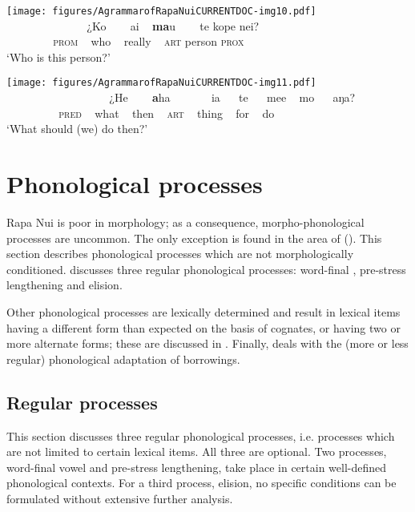  
\ea\label{ex:2.12}
\texttt{[image: figures/AgrammarofRapaNuiCURRENTDOC-img10.pdf]}\\
\gll ~ ~ ~ ~ ~~~~~~~ ¿Ko ~~~ ai ~ \textbf{ma}u ~~~ te kope nei? \\
 ~ ~ ~ ~ ~ \textsc{prom} ~ who ~ really ~ \textsc{art} person \textsc{prox} \\

\glt 
‘Who is this person?’ \textstyleExampleref{[R630-05.063]}
\z

\ea\label{ex:2.13}
\texttt{[image: figures/AgrammarofRapaNuiCURRENTDOC-img11.pdf]}\\
\gll ~ ~ ~ ~ ~~~~~~~~~~~ ¿He ~~~ \textbf{a}ha ~~~~~~ ia ~~ te ~~ me{\ꞌ}e ~ mo ~~ aŋa? \\
 ~ ~ ~ ~ ~ ~\textsc{pred} ~ what ~ then ~ \textsc{art} ~ thing ~ for ~ do \\

\glt 
‘What should (we) do then?’ \textstyleExampleref{[R630-03.007]}\textstyleExampleref{} 
\z



\section{Phonological processes}\label{sec:2.5}

Rapa Nui is poor in morphology; as a consequence, morpho-phonological processes are uncommon. The only exception is found in the area of  (). This section describes phonological processes which are not morphologically conditioned.  discusses three regular phonological processes: word-final , pre-stress lengthening and elision. 

Other phonological processes are lexically determined and result in lexical items having a different form than expected on the basis of cognates, or having two or more alternate forms; these are discussed in . Finally,  deals with the (more or less regular) phonological adaptation of borrowings.

\subsection{Regular processes}\label{sec:2.5.1}

This section discusses three regular phonological processes, i.e. processes which are not limited to certain lexical items. All three are optional. Two processes, word-final vowel  and pre-stress lengthening, take place in certain well-defined phonological contexts. For a third process, elision, no specific conditions can be formulated without extensive further analysis.
 
